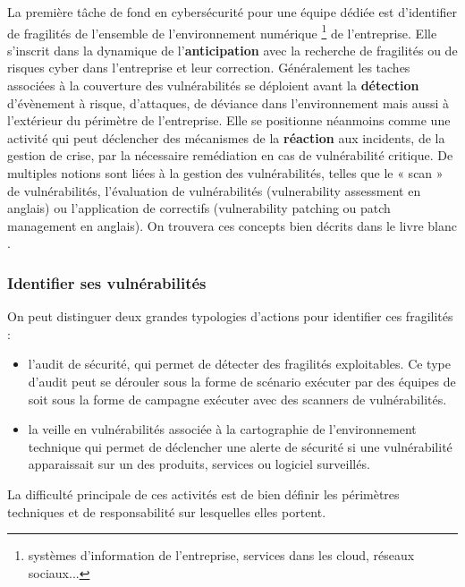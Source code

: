 La première tâche de fond en cybersécurité pour une équipe dédiée est d'identifier de fragilités de l'ensemble de l'environnement numérique \footnote{systèmes d'information de l'entreprise, services dans les cloud, réseaux sociaux...} de l'entreprise. Elle s'inscrit dans la dynamique de l'\textbf{anticipation} avec la recherche de fragilités ou de risques cyber dans l'entreprise et leur correction. Généralement les taches associées à la couverture des vulnérabilités se déploient avant la \textbf{détection} d'évènement à risque, d'attaques, de déviance dans l'environnement mais aussi à l'extérieur du périmètre de l'entreprise.
Elle se positionne néanmoins comme une activité qui peut déclencher des mécanismes de la \textbf{réaction} aux incidents, de la gestion de crise, par la nécessaire remédiation en cas de vulnérabilité critique.
De multiples notions sont liées à la gestion des vulnérabilités, telles que le « scan » de vulnérabilités, l’évaluation de vulnérabilités (vulnerability assessment en anglais) ou l’application de correctifs (vulnerability patching ou patch management en anglais). On trouvera ces concepts bien décrits dans le livre blanc .


\begin{frame}
\frametitle<presentation>{Identifier ses vulnérabilités}
On peut distinguer deux grandes typologies d'actions pour identifier ces fragilités :
\begin{itemize}
	\item l'audit de sécurité, qui permet de détecter des fragilités exploitables. Ce type d'audit peut se dérouler sous la forme de scénario exécuter par des équipes de  soit sous la forme de campagne exécuter avec des scanners de vulnérabilités.
	\item la veille en vulnérabilités associée à la cartographie de l'environnement technique qui permet de déclencher une alerte de sécurité si une vulnérabilité apparaissait sur un des produits, services ou logiciel surveillés.
\end{itemize}
\end{frame}

La difficulté principale de ces activités est de bien définir les périmètres techniques et de responsabilité sur lesquelles elles portent.

